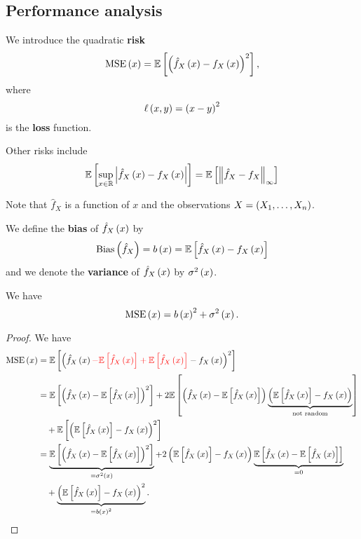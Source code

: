 \subsection{Performance analysis}
\begin{definition}
  We introduce the quadratic \textbf{risk}
  \begin{equation*}
    \mathrm{MSE}\left(x\right) = \mathbb{E}\left[\left(\hat{f}_X\left(x\right) - f_X\left(x\right)\right)^2\right],
  \end{equation*}
  where
  \begin{equation*}
    \ell\left(x,y\right) = \left(x-y\right)^2
  \end{equation*}
  is the \textbf{loss} function.

  Other risks include
  \begin{equation*}
    \mathbb{E}\left[\sup_{x\in \mathbb{R}} \left| \hat{f}_X\left(x\right)-f_X\left(x\right)\right|\right] = \mathbb{E}\left[\left\| \hat{f}_X-f_X  \right\|_\infty\right]
  \end{equation*}
\end{definition}
Note that $\hat{f}_X$ is a function of $x$ and the observations $X= \left(X_1,\ldots, X_n\right)$.

\begin{definition}
  We define the \textbf{bias} of $\hat{f}_X\left(x\right)$ by
  \begin{equation*}
    \mathrm{Bias}\left(\hat{f}_X\right) = b\left(x\right) = \mathbb{E}\left[\hat{f}_X\left(x\right) - f_X\left(x\right)\right]
  \end{equation*}
  and we denote the \textbf{variance} of $\hat{f}_X\left(x\right)$ by $\sigma^2\left(x\right)$.
\end{definition}

\begin{proposition}
  We have
  \begin{equation*}
    \mathrm{MSE}\left(x\right) = b\left(x\right)^2 + \sigma^2\left(x\right).
  \end{equation*}
\end{proposition}
\begin{proof}
We have
  \begin{equation*}
    \begin{split}
      \mathrm{MSE}\left(x\right) &= \mathbb{E}\left[ \left(\hat{f}_X\left(x\right) {\color{red}- \mathbb{E}\left[\hat{f}_X\left(x\right)\right] + \mathbb{E}\left[\hat{f}_X\left(x\right)\right]} - f_X\left(x\right)\right)^2\right] \\
      &= \mathbb{E}\left[ \left(\hat{f}_X\left(x\right) - \mathbb{E}\left[\hat{f}_X\left(x\right)\right]\right)^2\right] + 2 \mathbb{E}\left[\left(\hat{f}_X\left(x\right)- \mathbb{E}\left[\hat{f}_X\left(x\right)\right]\right)\underbrace{\left(\mathbb{E}\left[\hat{f}_X\left(x\right)\right] - f_X\left(x\right)\right)}_{\text{not random}} \right] \\
      &\quad + \mathbb{E}\left[\left(\mathbb{E}\left[\hat{f}_X\left(x\right)\right] - f_X\left(x\right)\right)^2\right] \\
      &= \underbrace{\mathbb{E}\left[ \left(\hat{f}_X\left(x\right) - \mathbb{E}\left[\hat{f}_X\left(x\right)\right]\right)^2\right]}_{=\sigma^2\left(x\right)} + 2 \left(\mathbb{E}\left[\hat{f}_X\left(x\right)\right] - f_X\left(x\right)\right) \underbrace{\mathbb{E}\left[\hat{f}_X\left(x\right)- \mathbb{E}\left[\hat{f}_X\left(x\right)\right]\right] }_{=0} \\
      &\quad + \underbrace{\left(\mathbb{E}\left[\hat{f}_X\left(x\right)\right] - f_X\left(x\right)\right)^2}_{=b\left(x\right)^2}. \\
    \end{split}
  \end{equation*}
\end{proof}

